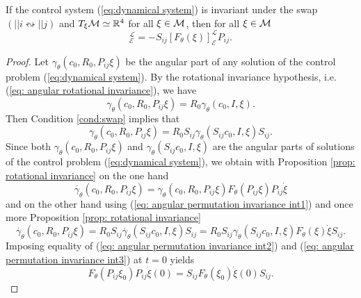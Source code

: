 \begin{proposition}
\label{prop: angular permutation invariance}
If the control system (\ref{eq:dynamical system}) is invariant under the swap $(||i \leftrightsquigarrow ||j)$ and $T_{\xi}\mathcal{M} \simeq \mathbb{R}^4$ for all $\xi \in \mathcal{M}$, then for all $\xi \in \mathcal{M}$
\begin{equation}
[F_{\theta}(P_{ij} \xi)]_{\mathcal{E}}^{\mathcal{L}} = - S_{ij} [F_{\theta}(\xi)]_{\mathcal{E}}^{\mathcal{L}} P_{ij}.
\end{equation}
\end{proposition}

\begin{proof}
Let $\gamma_\theta(c_0, R_0, P_{ij}\xi)$ be the angular part of any solution of the control problem (\ref{eq:dynamical system}). By the rotational invariance hypothesis, i.e. (\ref{eq: angular rotational invariance}), we have
\begin{equation}
	\gamma_\theta(c_0, R_0, P_{ij}\xi) = R_0 \gamma_\theta(c_0, I, \xi).
\end{equation}
Then Condition \ref{cond:swap} implies that
\begin{equation}
\label{eq: angular permutation invariance int1}
	\gamma_\theta(c_0, R_0,P_{ij} \xi) = R_0 S_{ij} \gamma_\theta(S_{ij}c_0, I, \xi) S_{ij}.
\end{equation}
Since both $\gamma_\theta(c_0, R_0, P_{ij} \xi)$ and $\gamma_\theta(S_{ij} c_0, I, \xi)$ are the angular parts of solutions of the control problem (\ref{eq:dynamical system}), we obtain with Proposition \ref{prop: rotational invariance} on the one hand
\begin{equation}
\label{eq: angular permutation invariance int2}
	\dot{\gamma_\theta}(c_0, R_0, P_{ij} \xi)= \gamma_\theta(c_0, R_0, P_{ij} \xi) F_{\theta}(P_{ij} \xi) P_{ij } \dot{\xi}
\end{equation}
and on the other hand using (\ref{eq: angular permutation invariance int1}) and once more Proposition \ref{prop: rotational invariance}
\begin{equation}
\label{eq: angular permutation invariance int3}
	\dot{\gamma_\theta}(c_0, R_0, P_{ij} \xi) =  R_0 S_{ij} \dot{\gamma_\theta}(S_{ij} c_0, I, \xi) S_{ij} = R_0 S_{ij} \gamma_\theta(S_{ij} c_0, I, \xi) F_{\theta}(\xi) \dot{\xi} S_{ij}.
\end{equation}
Imposing equality of (\ref{eq: angular permutation invariance int2}) and (\ref{eq: angular permutation invariance int3}) at $t = 0$ yields
\begin{equation}
	F_{\theta}(P_{ij} \xi_0) P_{ij}  \dot{\xi}(0) = S_{ij} F_{\theta}(\xi_0) \dot{\xi}(0) S_{ij}.

\end{equation}
\end{proof}

